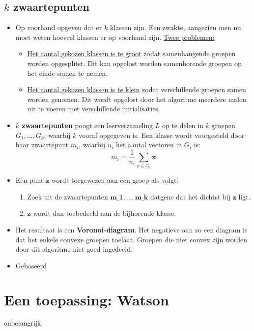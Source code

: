 \subsection{$k$ zwaartepunten}
\begin{itemize}
	\item Op voorhand opgeven dat er $k$ klassen zijn.
	\alert Een zwakte, aangezien men nu moet weten hoeveel klassen er op voorhand zijn. \underline{Twee problemen:}
	\begin{itemize}
		\item \underline{Het aantal gekozen klassen is te groot} zodat samenhangende groepen worden opgesplitst. Dit kan opgelost worden samenhorende groepen op het einde samen te nemen.
		\item \underline{Het aantal gekozen klassen is te klein} zodat verschillende groepen samen worden genomen. Dit wordt opgelost door het algoritme meerdere malen uit te voeren met verschillende initialisaties. 
	\end{itemize}
	\item \textbf{$k$ zwaartepunten} poogt een leerverzameling $L$ op te delen in $k$ groepen $G_1, ..., G_k$, waarbij $k$ vooraf opgegeven is. Een klasse wordt voorgesteld door haar zwaartepunt $m_i$, waarbij $n_i$ het aantal vectoren in $G_i$ is:
	$$m_i = \frac{1}{n_i}\sum_{x \in G_i} \textbf{x}$$
	\item Een punt $\textbf{z}$ wordt toegewezen aan een groep als volgt:
	\begin{enumerate}
		\item Zoek uit de zwaartepunten $\textbf{m_1}, ..., \textbf{m_k}$ datgene dat het dichtst bij $\textbf{z}$ ligt.
		\item $\textbf{z}$ wordt dan toebedeeld aan de bijhorende klasse.
	\end{enumerate}
	\item Het resultaat is een \textbf{Voronoi-diagram}. Het negatieve aan zo een diagram is dat het enkele convexe groepen toelaat.
	\alert Groepen die niet convex zijn worden door dit algoritme niet goed ingedeeld.
	\item Gebaseerd 
	
\end{itemize}
\section{Een toepassing: Watson}
onbelangrijk